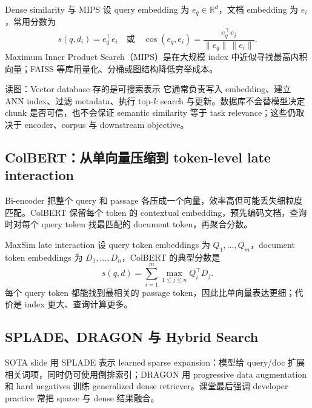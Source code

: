 \begin{importantbox}{Dense similarity 与 MIPS}
设 query embedding 为 $e_q\in\mathbb{R}^d$，文档 embedding 为 $e_i$，常用分数为
\[
s(q,d_i)=e_q^\top e_i
\quad\text{或}\quad
\cos(e_q,e_i)=\frac{e_q^\top e_i}{\|e_q\|\,\|e_i\|}.
\]
Maximum Inner Product Search（MIPS）是在大规模 index 中近似寻找最高内积向量；FAISS 等库用量化、分桶或图结构降低穷举成本。
\end{importantbox}


\begin{knowledgebox}{读图：Vector database 存的是可搜索表示}
它通常负责写入 embedding、建立 ANN index、过滤 metadata、执行 top-$k$ search 与更新。数据库不会替模型决定 chunk 是否可信，也不会保证 semantic similarity 等于 task relevance；这些仍取决于 encoder、corpus 与 downstream objective。
\end{knowledgebox}

\subsection{ColBERT：从单向量压缩到 token-level late interaction}

Bi-encoder 把整个 query 和 passage 各压成一个向量，效率高但可能丢失细粒度匹配。ColBERT 保留每个 token 的 contextual embedding，预先编码文档，查询时对每个 query token 找最匹配的 document token，再聚合分数。


\begin{importantbox}{MaxSim late interaction}
设 query token embeddings 为 $Q_1,\ldots,Q_m$，document token embeddings 为 $D_1,\ldots,D_n$，ColBERT 的典型分数是
\[
s(q,d)=\sum_{i=1}^{m}\max_{1\le j\le n} Q_i^\top D_j.
\]
每个 query token 都能找到最相关的 passage token，因此比单向量表达更细；代价是 index 更大、查询计算更多。
\end{importantbox}

\subsection{SPLADE、DRAGON 与 Hybrid Search}

SOTA slide 用 SPLADE 表示 learned sparse expansion：模型给 query/doc 扩展相关词项，同时仍可使用倒排索引；DRAGON 用 progressive data augmentation 和 hard negatives 训练 generalized dense retriever。课堂最后强调 developer practice 常把 sparse 与 dense 结果融合。

